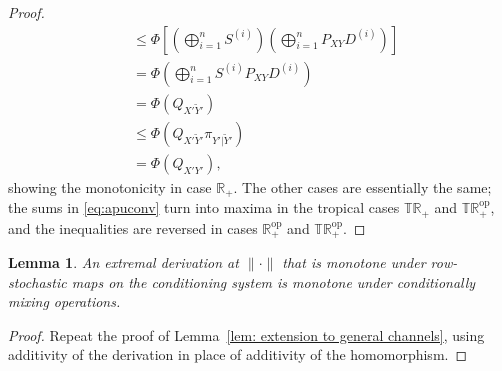 \documentclass[aps,pra,11pt,onecolumn,nofootinbib,tightenlines]{revtex4-2}
\newtheorem{lemma}[theorem]{Lemma}
\theoremstyle{definition}
\begin{document}
\begin{proof}
\begin{align}
&\leq\Phi\left[\left(\bigoplus_{i=1}^n S^{(i)}\right)\left(\bigoplus_{i=1}^n P_{XY}D^{(i)}\right)\right]\\
&=\Phi\left(\bigoplus_{i=1}^n S^{(i)}P_{XY}D^{(i)}\right)\\
&=\Phi(Q_{X'\widetilde{Y}'})\\
&\leq\Phi(Q_{X'\widetilde{Y}'}\pi_{Y'|\widetilde{Y}'})\\
&=\Phi(Q_{X'Y'}),
\end{align}
showing the monotonicity in case $\mathbb{R}_+$. The other cases are essentially the same; the sums in \eqref{eq:apuconv} turn into maxima in the tropical cases $\mathbb{TR}_+$ and $\mathbb{TR}^{\mathrm{op}}_+$, and the inequalities are reversed in cases $\mathbb{R}^{\mathrm{op}}_+$ and $\mathbb{TR}^{\mathrm{op}}_+$.
\end{proof}
\begin{lemma}
\label{lem:extension-to-general-channels-derivations}
An extremal derivation at $\|\cdot\|$ that is monotone under row-stochastic
maps on the conditioning system is monotone under conditionally mixing
operations.
\end{lemma}
\begin{proof}
Repeat the proof of Lemma~\ref{lem: extension to general channels}, using
additivity of the derivation in place of additivity of the homomorphism.
\end{proof}
\end{document}
